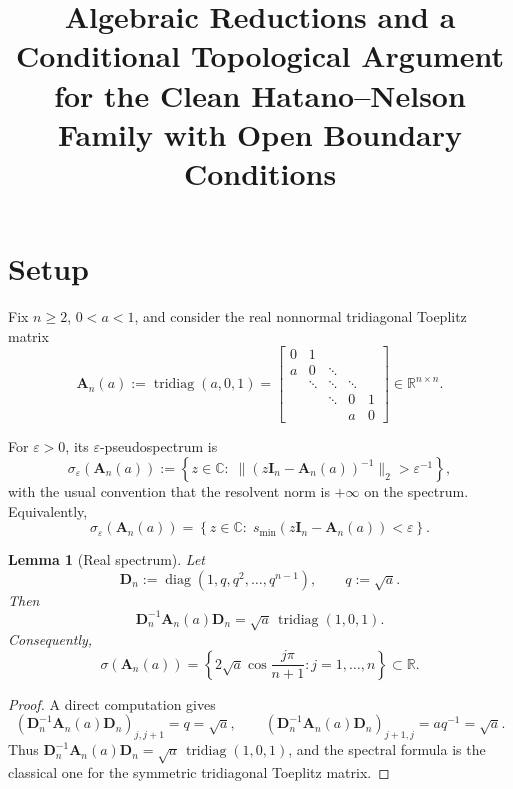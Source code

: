 \documentclass[11pt]{article}
\title{Algebraic Reductions and a Conditional Topological Argument\\
for the Clean Hatano--Nelson Family with Open Boundary Conditions}
\author{}
\date{}
\newtheorem{lemma}[theorem]{Lemma}
\DeclareMathOperator{\diag}{diag}
\DeclareMathOperator{\tridiag}{tridiag}
\newcommand{\R}{\mathbb{R}}
\newcommand{\C}{\mathbb{C}}
\begin{document}
\maketitle

\section{Setup}

Fix \(n\ge 2\), \(0<a<1\), and consider the real nonnormal tridiagonal Toeplitz matrix
\[
\mathbf A_n(a):=\tridiag(a,0,1)
=
\begin{bmatrix}
0 & 1 \\
a & 0 & \ddots \\
& \ddots & \ddots & \ddots \\
&& \ddots & 0 & 1 \\
&&& a & 0
\end{bmatrix}\in \R^{n\times n}.
\]

For \(\varepsilon>0\), its \(\varepsilon\)-pseudospectrum is
\[
\sigma_\varepsilon(\mathbf A_n(a))
:=
\left\{
z\in\C:\;
\|(z\mathbf I_n-\mathbf A_n(a))^{-1}\|_2>\varepsilon^{-1}
\right\},
\]
with the usual convention that the resolvent norm is \(+\infty\) on the spectrum.
Equivalently,
\[
\sigma_\varepsilon(\mathbf A_n(a))
=
\left\{
z\in\C:\;
s_{\min}(z\mathbf I_n-\mathbf A_n(a))<\varepsilon
\right\}.
\]

\begin{lemma}[Real spectrum]\label{lem:real-spectrum}
Let
\[
\mathbf D_n:=\diag(1,q,q^2,\dots,q^{n-1}),
\qquad
q:=\sqrt a.
\]
Then
\[
\mathbf D_n^{-1}\mathbf A_n(a)\mathbf D_n
=
\sqrt a\,\tridiag(1,0,1).
\]
Consequently,
\[
\sigma(\mathbf A_n(a))
=
\left\{
2\sqrt a \cos\frac{j\pi}{n+1}:j=1,\dots,n
\right\}
\subset \R.
\]
\end{lemma}

\begin{proof}
A direct computation gives
\[
(\mathbf D_n^{-1}\mathbf A_n(a)\mathbf D_n)_{j,j+1}=q=\sqrt a,
\qquad
(\mathbf D_n^{-1}\mathbf A_n(a)\mathbf D_n)_{j+1,j}=aq^{-1}=\sqrt a.
\]
Thus \(\mathbf D_n^{-1}\mathbf A_n(a)\mathbf D_n=\sqrt a\,\tridiag(1,0,1)\), and the spectral formula is the classical one for the symmetric tridiagonal Toeplitz matrix.
\end{proof}
\end{document}

